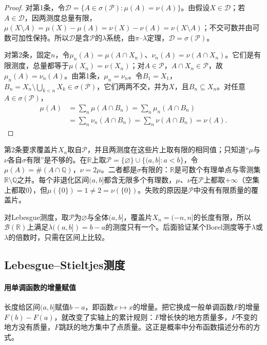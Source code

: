 \begin{proof}
对第1条，令$\mathcal D=\{A\in\sigma(\mathcal P):\mu(A)=\nu(A)\}$。由假设$X\in\mathcal D$；若$A\in\mathcal D$，因两测度总量有限，$\mu(X\setminus A)=\mu(X)-\mu(A)=\nu(X)-\nu(A)=\nu(X\setminus A)$；不交可数并由可数可加性保持。所以$\mathcal D$是含$\mathcal P$的$\lambda$系统，由$\pi$--$\lambda$定理，$\mathcal D=\sigma(\mathcal P)$。

对第2条，固定$n$，令$\mu_n(A)=\mu(A\cap X_n)$、$\nu_n(A)=\nu(A\cap X_n)$。它们是有限测度，总量都等于$\mu(X_n)=\nu(X_n)$；对$A\in\mathcal P$，$A\cap X_n\in\mathcal P$，故$\mu_n(A)=\nu_n(A)$。由第1条，$\mu_n=\nu_n$。令$B_1=X_1$，$B_n=X_n\setminus\bigcup_{k<n}X_k\in\sigma(\mathcal P)$，它们两两不交，并为$X$，且$B_n\subseteq X_n$。对任意$A\in\sigma(\mathcal P)$，
\[
 \begin{aligned}
  \mu(A)&=\sum_n\mu(A\cap B_n)=\sum_n\mu_n(A\cap B_n)\\
  &=\sum_n\nu_n(A\cap B_n)=\sum_n\nu(A\cap B_n)=\nu(A).
 \end{aligned}
\]
\end{proof}

第2条要求覆盖片$X_n$取自$\mathcal P$，并且两测度在这些片上取有限的相同值；只知道“$\mu$与$\nu$各自$\sigma$有限”是不够的。在$\mathbb R$上取$\mathcal P=\{\varnothing\}\cup\{(a,b]:a<b\}$，令$\mu(A)=\#(A\cap\mathbb Q)$，$\nu=2\mu$。二者都是$\sigma$有限的：$\mathbb R$是可数个有理单点与零测集$\mathbb R\setminus\mathbb Q$之并。每个非退化区间$(a,b]$都含无限多个有理数，$\mu$、$\nu$在$\mathcal P$上都取$+\infty$（空集上都取$0$），但$\mu(\{0\})=1\ne2=\nu(\{0\})$。失败的原因是$\mathcal P$中没有有限质量的覆盖片。

对Lebesgue测度，取$\mathcal P$为$\varnothing$与全体$(a,b]$，覆盖片$X_n=(-n,n]$的长度有限，所以$\mathcal B(\mathbb R)$上满足$\lambda((a,b])=b-a$的测度只有一个。后面验证某个Borel测度等于$\lambda$或$\lambda$的倍数时，只需在区间上比较。

\subsection{Lebesgue--Stieltjes测度}
\label{sec:measure-stieltjes}

\paragraph{用单调函数的增量赋值}
长度给区间$(a,b]$赋值$b-a$，即函数$x\mapsto x$的增量。把它换成一般单调函数$F$的增量$F(b)-F(a)$，就改变了实轴上的累计规则：$F$增长快的地方质量多，$F$不变的地方没有质量，$F$跳跃的地方集中了点质量。这正是概率中分布函数描述分布的方式。

